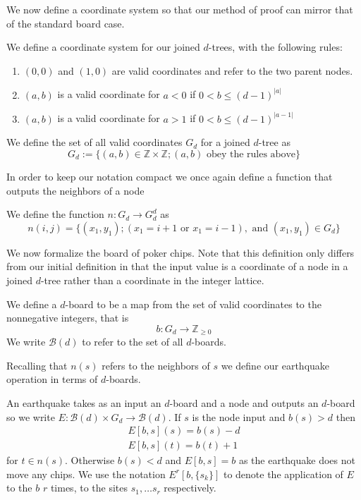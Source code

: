 \documentclass[runningheads,a4paper]{llncs}
\begin{document}
We now define a coordinate system so that our method of proof can mirror that of the standard board case.
\begin{definition} We define a coordinate system for our joined $d$-trees, with the following rules:
\begin{enumerate}
	\item $(0,0)$ and $(1,0)$ are valid coordinates and refer to the two parent nodes.
	\item $(a,b)$ is a valid coordinate for $a<0$ if $0<b \leq (d-1)^{|a|}$
	\item $(a,b)$ is a valid coordinate for $a>1$ if $0<b \leq (d-1)^{|a-1|}$
\end{enumerate}
We define the set of all valid coordinates $G_d$ for a joined $d$-tree as 
\begin{equation}
G_d:= \{ (a,b) \in \mathbb{Z} \times \mathbb{Z} ; (a,b) \text{ obey the rules above}\}
\end{equation}
\end{definition}

In order to keep our notation compact we once again define a function that outputs the neighbors of a node
\begin{definition} 
We define the function $n: G_d \rightarrow G_d^d$ as 
\begin{equation*}
n(i,j) = \{ (x_1, y_1); (x_1 = i+1 \text{ or } x_1=i-1), \text{ and }(x_1, y_1) \in G_d\}
\end{equation*}
\end{definition}

We now formalize the board of poker chips. Note that this definition only differs from our initial definition in that the input value is a coordinate of a node in a joined $d$-tree rather than a coordinate in the integer lattice.
\begin{definition}
We define a $d$-board to be a map from the set of valid coordinates to the nonnegative integers, that is 
\begin{equation}
b:  G_d \rightarrow \mathbb{Z}_{\geq 0}
\end{equation}
We write $\mathcal{B}(d)$ to refer to the set of all $d$-boards.  
\end{definition}

Recalling that $n(s)$ refers to the neighbors of $s$ we define our earthquake operation in terms of $d$-boards.
\begin{definition}
An earthquake takes as an input an $d$-board and a node and outputs an $d$-board so we write $E: \mathcal{B}(d) \times G_d \rightarrow \mathcal{B}(d)$. If $s$ is the node input and $b(s)>d$ then 
\begin{align*}
E[b, s](s) = b(s)- d \\
E[b, s](t) = b(t) +1 
\end{align*}
for $t \in n(s)$. Otherwise $b(s)<d$ and $E[b,s]=b$ as the earthquake does not move any chips. We use the notation $E^r[b, \{s_k\}]$ to denote the application of $E$ to the $b$ $r$ times, to the sites $s_1, \ldots s_r$ respectively.
\end{definition}
\end{document}
